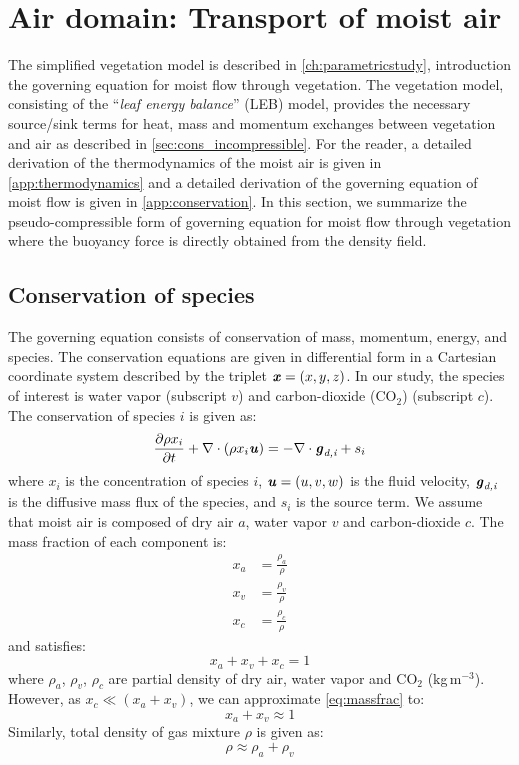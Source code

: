 \section{Air domain: Transport of moist air}
\label{sec:airdomain}
The simplified vegetation model is described in \cref{ch:parametricstudy}, introduction the governing equation for moist flow through vegetation. The vegetation model, consisting of the ``\textit{leaf energy balance}'' (LEB) model, provides the necessary source/sink terms for heat, mass and momentum exchanges between vegetation and air as described in \cref{sec:cons_incompressible}. For the reader, a detailed derivation of the thermodynamics of the moist air is given in \cref{app:thermodynamics} and a detailed derivation of the governing equation of moist flow is given in \cref{app:conservation}. In this section, we summarize the pseudo-compressible form of governing equation for moist flow through vegetation where the buoyancy force is directly obtained from the density field.  


\subsection*{Conservation of species}
The governing equation consists of conservation of mass, momentum, energy, and species. The conservation equations are given in differential form in a Cartesian coordinate system described by the triplet $\textbf{\textit{x}} = (x,y,z)$. In our study, the species of interest is water vapor (subscript $v$) and carbon-dioxide (CO$_2$) (subscript $c$). The conservation of species $i$ is given as:
\begin{equation}
\frac{\partial \rho x_i}{\partial t} + \nabla  \cdot \left( \rho x_i \textbf{\textit{u}} \right) = - \nabla \cdot \textbf{\textit{g}}_{\textit{d,i}} + s_i
\label{eq:xi}
\end{equation}
where $x_i$ is the concentration of species $i$, $\textbf{\textit{u}} = \left(u,v,w\right)$ is the fluid velocity, $\textbf{\textit{g}}_{\textit{d,i}}$ is the diffusive mass flux of the species, and $s_i$ is the source term. We assume that moist air is composed of dry air $a$, water vapor $v$ and carbon-dioxide $c$. The mass fraction of each component is:
\begin{align}
x_a &= \frac{\rho_a}{\rho} \\
x_v &= \frac{\rho_v}{\rho} \label{eq:xv}\\
x_c &= \frac{\rho_c}{\rho}\label{eq:xc}
\end{align}
and satisfies:
\begin{equation}
x_a + x_v + x_c = 1
\label{eq:massfrac}
\end{equation}
where $\rho_a$, $\rho_v$, $\rho_c$ are partial density of dry air, water vapor and CO$_2$ (kg\,m$^{-3}$). However, as $x_c \ll (x_a+x_v)$, we can approximate \cref{eq:massfrac} to:
\begin{equation}
x_a + x_v \approx 1
\end{equation}
Similarly, total density of gas mixture $\rho$ is given as:
\begin{equation}
\rho \approx \rho_a + \rho_v
\label{eq:rho2}
\end{equation} 

